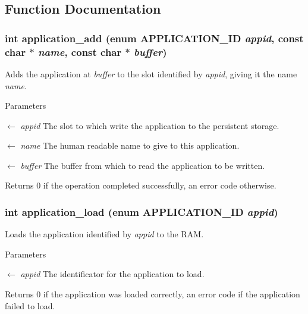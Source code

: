 \subsection{Function Documentation}
\subsubsection[{application\_\-add}]{\setlength{\rightskip}{0pt plus 5cm}int application\_\-add (enum {\bf APPLICATION\_\-ID} {\em appid}, \/  const char $\ast$ {\em name}, \/  const char $\ast$ {\em buffer})}\label{db/d45/manager_8h_a9e1962ad861e2a1e1d6f6d10bd8174ee}
Adds the application at {\itshape buffer\/} to the slot identified by {\itshape appid\/}, giving it the name {\itshape name\/}.


\begin{DoxyParams}{Parameters}
\item[\mbox{$\leftarrow$} {\em appid}]The slot to which write the application to the persistent storage. \item[\mbox{$\leftarrow$} {\em name}]The human readable name to give to this application. \item[\mbox{$\leftarrow$} {\em buffer}]The buffer from which to read the application to be written.\end{DoxyParams}
\begin{DoxyReturn}{Returns}
0 if the operation completed successfully, an error code otherwise. 
\end{DoxyReturn}
\subsubsection[{application\_\-load}]{\setlength{\rightskip}{0pt plus 5cm}int application\_\-load (enum {\bf APPLICATION\_\-ID} {\em appid})}\label{db/d45/manager_8h_abf567e8834d26f94b9d0440e21114be1}
Loads the application identified by {\itshape appid\/} to the RAM.


\begin{DoxyParams}{Parameters}
\item[\mbox{$\leftarrow$} {\em appid}]The identificator for the application to load.\end{DoxyParams}
\begin{DoxyReturn}{Returns}
0 if the application was loaded correctly, an error code if the application failed to load. 
\end{DoxyReturn}
